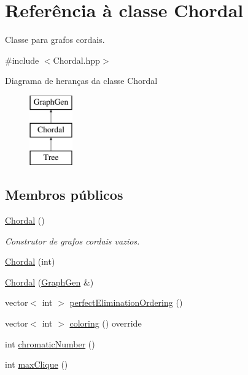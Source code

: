 \hypertarget{classChordal}{}\section{Referência à classe Chordal}
\label{classChordal}


Classe para grafos cordais.  




{\ttfamily \#include $<$Chordal.\+hpp$>$}

Diagrama de heranças da classe Chordal\begin{figure}[H]
\begin{center}
\leavevmode
\includegraphics[height=3.000000cm]{classChordal}
\end{center}
\end{figure}
\subsection*{Membros públicos}
\begin{DoxyCompactItemize}
\item 
\mbox{\label{classChordal_ab20403cdb91238d6576d0e757ae4c8f3}} 
\mbox{\hyperlink{classChordal_ab20403cdb91238d6576d0e757ae4c8f3}{Chordal}} ()
\begin{DoxyCompactList}\small\item\em Construtor de grafos cordais vazios. \end{DoxyCompactList}\item 
\mbox{\hyperlink{classChordal_af315e26462665f1881975cc27372a67a}{Chordal}} (int)
\item 
\mbox{\hyperlink{classChordal_a6ab51b523f1b150560fcae74db9eee68}{Chordal}} (\mbox{\hyperlink{classGraphGen}{Graph\+Gen}} \&)
\item 
vector$<$ int $>$ \mbox{\hyperlink{classChordal_a45b66b1ee19a628646d83613d337d94a}{perfect\+Elimination\+Ordering}} ()
\item 
vector$<$ int $>$ \mbox{\hyperlink{classChordal_acac4822a1eb3376c29f3d193baaec91f}{coloring}} () override
\item 
int \mbox{\hyperlink{classChordal_ad7e9a3c8bd7f66ad4ddc6221523e6b12}{chromatic\+Number}} ()
\item 
int \mbox{\hyperlink{classChordal_aa19bddaef6b83d8bdb98993cf04929b7}{max\+Clique}} ()
\end{DoxyCompactItemize}
